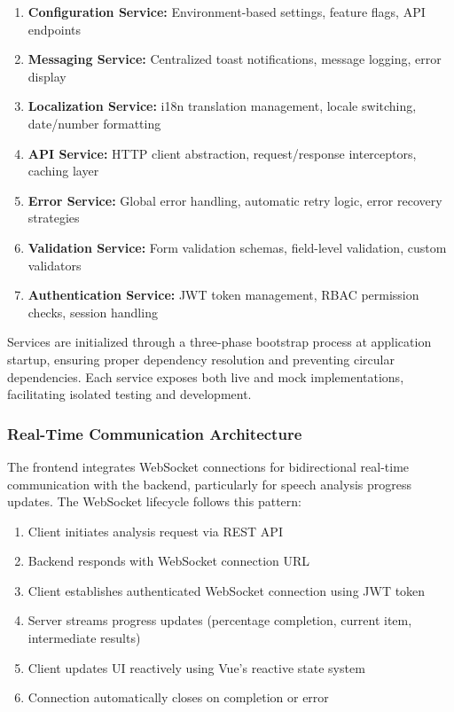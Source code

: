\begin{enumerate}
    \item \textbf{Configuration Service:} Environment-based settings, feature flags, API endpoints
    \item \textbf{Messaging Service:} Centralized toast notifications, message logging, error display
    \item \textbf{Localization Service:} i18n translation management, locale switching, date/number formatting
    \item \textbf{API Service:} HTTP client abstraction, request/response interceptors, caching layer
    \item \textbf{Error Service:} Global error handling, automatic retry logic, error recovery strategies
    \item \textbf{Validation Service:} Form validation schemas, field-level validation, custom validators
    \item \textbf{Authentication Service:} JWT token management, RBAC permission checks, session handling
\end{enumerate}

Services are initialized through a three-phase bootstrap process at application startup, ensuring proper dependency resolution and preventing circular dependencies. Each service exposes both live and mock implementations, facilitating isolated testing and development.

\subsubsection{Real-Time Communication Architecture}

The frontend integrates WebSocket connections for bidirectional real-time communication with the backend, particularly for speech analysis progress updates. The WebSocket lifecycle follows this pattern:

\begin{enumerate}
    \item Client initiates analysis request via REST API
    \item Backend responds with WebSocket connection URL
    \item Client establishes authenticated WebSocket connection using JWT token
    \item Server streams progress updates (percentage completion, current item, intermediate results)
    \item Client updates UI reactively using Vue's reactive state system
    \item Connection automatically closes on completion or error
\end{enumerate}

